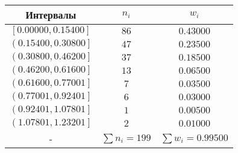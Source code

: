 %
\normalsize%
\begin{longtabu}spread 0pt{ | c | c | c | }%
\hline%
Интервалы&$n_i$&$w_i$\\%
\hline%
$\left[0.00000,0.15400\right]$&$86$&$0.43000$\\%
\hline%
$\left(0.15400,0.30800\right]$&$47$&$0.23500$\\%
\hline%
$\left(0.30800,0.46200\right]$&$37$&$0.18500$\\%
\hline%
$\left(0.46200,0.61600\right]$&$13$&$0.06500$\\%
\hline%
$\left(0.61600,0.77001\right]$&$7$&$0.03500$\\%
\hline%
$\left(0.77001,0.92401\right]$&$6$&$0.03000$\\%
\hline%
$\left(0.92401,1.07801\right]$&$1$&$0.00500$\\%
\hline%
$\left(1.07801,1.23201\right]$&$2$&$0.01000$\\%
\hline%
{-}&$\sum\limits n_i = 199$&$\sum\limits w_i = 0.99500$\\%
\hline%
\end{longtabu}%
%